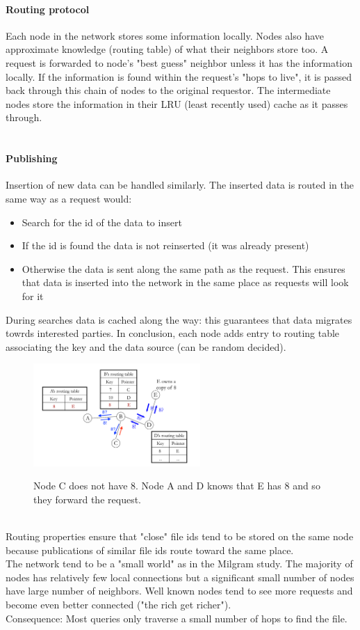 \documentclass[10pt,a4paper]{article}
\begin{document}
\paragraph{Routing protocol}
Each node in the network stores some information locally. Nodes also have approximate knowledge (routing table) of what their neighbors store too. A request is forwarded to node's "best guess" neighbor unless it has the information locally. If the information is found within the request's "hops to live", it is passed back through this chain of nodes to the original requestor. The intermediate nodes store the information in their LRU (least recently used) cache as it passes through. \\ \\
\paragraph{Publishing}
Insertion of new data can be handled similarly. The inserted data is routed in the same way as a request would:
\begin{itemize}
	\item Search for the id of the data to insert
	\item If the id is found the data is not reinserted (it was already present)
	\item Otherwise the data is sent along the same path as the request. This ensures that data is inserted into the network in the same place as requests will look for it
\end{itemize}
During searches data is cached along the way: this guarantees that data migrates towrds interested parties. In conclusion, each node adds entry to routing table associating the key and the data source (can be random decided).
\begin{figure}[h!]
\hfill \includegraphics[width=180pt]{images/freenet-routing.png}\hspace*{\fill}
  \label{fig:freenet-routing}
  \caption{Node C does not have 8. Node A and D knows that E has 8 and so they forward the request.}
\end{figure}  \\
Routing properties ensure that "close" file ids tend to be stored on the same node because publications of similar file ids route toward the same place. \\ The network tend to be a "small world" as in the Milgram study. The majority of nodes has relatively few local connections but a significant small number of nodes have large number of neighbors. Well known nodes tend to see more requests and become even better connected ("the rich get richer"). \\ Consequence: Most queries only traverse a small number of hops to find the file.
\end{document}
